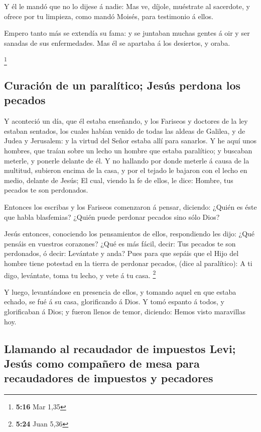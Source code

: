  Y él le mandó que no lo dijese á nadie: Mas ve, díjole,
muéstrate al sacerdote, y ofrece por tu limpieza, como mandó Moisés,
para testimonio á ellos.

 Empero tanto más se extendía su fama: y se juntaban muchas
gentes á oir y ser sanadas de sus enfermedades.  Mas él se
apartaba á los desiertos, y oraba.

\footnote{\textbf{5:16} Mar 1,35}

\hypertarget{curaciuxf3n-de-un-paraluxedtico-jesuxfas-perdona-los-pecados}{%
\subsection{Curación de un paralítico; Jesús perdona los
pecados}\label{curaciuxf3n-de-un-paraluxedtico-jesuxfas-perdona-los-pecados}}

 Y aconteció un día, que él estaba enseñando, y los
Fariseos y doctores de la ley estaban sentados, los cuales habían venido
de todas las aldeas de Galilea, y de Judea y Jerusalem: y la virtud del
Señor estaba allí para sanarlos.  Y he aquí unos hombres,
que traían sobre un lecho un hombre que estaba paralítico; y buscaban
meterle, y ponerle delante de él.  Y no hallando por donde
meterle á causa de la multitud, subieron encima de la casa, y por el
tejado le bajaron con el lecho en medio, delante de Jesús; 
El cual, viendo la fe de ellos, le dice: Hombre, tus pecados te son
perdonados.

 Entonces los escribas y los Fariseos comenzaron á pensar,
diciendo: ¿Quién es éste que habla blasfemias? ¿Quién puede perdonar
pecados sino sólo Dios?

 Jesús entonces, conociendo los pensamientos de ellos,
respondiendo les dijo: ¿Qué pensáis en vuestros corazones? 
¿Qué es más fácil, decir: Tus pecados te son perdonados, ó decir:
Levántate y anda?  Pues para que sepáis que el Hijo del
hombre tiene potestad en la tierra de perdonar pecados, (dice al
paralítico): A ti digo, levántate, toma tu lecho, y vete á tu casa.
\footnote{\textbf{5:24} Juan 5,36}

 Y luego, levantándose en presencia de ellos, y tomando
aquel en que estaba echado, se fué á su casa, glorificando á Dios.
 Y tomó espanto á todos, y glorificaban á Dios; y fueron
llenos de temor, diciendo: Hemos visto maravillas hoy.

\hypertarget{llamando-al-recaudador-de-impuestos-levi-jesuxfas-como-compauxf1ero-de-mesa-para-recaudadores-de-impuestos-y-pecadores}{%
\subsection{Llamando al recaudador de impuestos Levi; Jesús como
compañero de mesa para recaudadores de impuestos y
pecadores}\label{llamando-al-recaudador-de-impuestos-levi-jesuxfas-como-compauxf1ero-de-mesa-para-recaudadores-de-impuestos-y-pecadores}}

